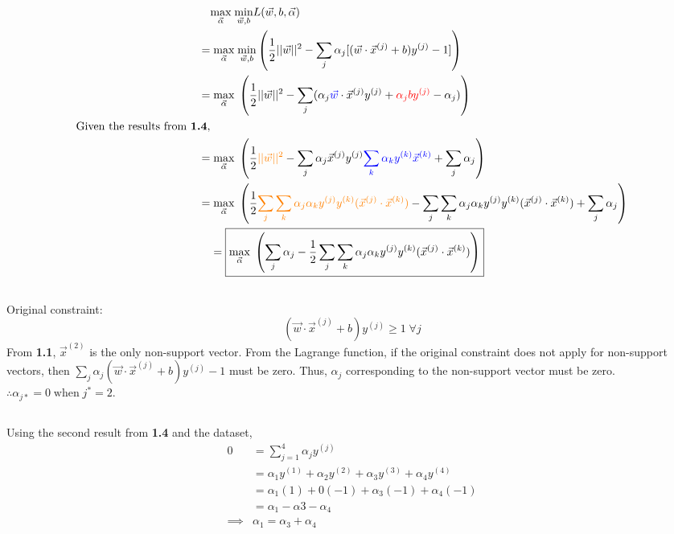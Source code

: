 \documentclass{article}
\begin{document}
\subsection{}
\begin{align*}
& \underset{\vec{\alpha}}{\text{max}}\;  \underset{\vec{w}, b}{\text{min}} L(\vec{w}, b, \vec{\alpha}) \\
=  & \;  \underset{\vec{\alpha}}{\text{max}}\;  \underset{\vec{w}, b}{\text{min}} \left(  \frac{1}{2} || \vec{w} || ^2 - \sum_j \alpha_j [ (\vec{w} \cdot \vec{x}^{(j)} + b)y^{(j)} -1] \right) \\
=  & \;  \underset{\vec{\alpha}}{\text{max}}\;  \left(  \frac{1}{2} || \vec{w} || ^2 - \sum_j (  \alpha_j \textcolor{blue}{\vec{w}} \cdot \vec{x}^{(j)} y^{(j)} + \textcolor{red}{\alpha_j b y^{(j)}} -\alpha_j ) \right) \\
\text{Given the results from \textbf{1.4},} \\
= & \;  \underset{\vec{\alpha}}{\text{max}}\;  \left( \frac{1}{2} \textcolor{orange}{|| \vec{w} || ^2} - \sum_j \alpha_j \vec{x}^{(j)} y^{(j)} \textcolor{blue}{\sum_k \alpha_k y^{(k)} \vec{x}^{(k)}} + \sum_j \alpha_j \right) \\
= & \;  \underset{\vec{\alpha}}{\text{max}}\; \left(\frac{1}{2} \textcolor{orange}{\sum_j \sum_k \alpha_j \alpha_k y^{(j)} y^{(k)} (\vec{x}^{(j)} \cdot \vec{x}^{(k)} )} - \sum_j \sum_k \alpha_j \alpha_k y^{(j)} y^{(k)} (\vec{x}^{(j)} \cdot \vec{x}^{(k)} ) + \sum_j \alpha_j \right) \\
& = \boxed{\underset{\vec{\alpha}}{\text{max}}\; \left( \sum_j \alpha_j - \frac{1}{2} \sum_j \sum_k \alpha_j \alpha_k y^{(j)} y^{(k)} (\vec{x}^{(j)} \cdot \vec{x}^{(k)} ) \right)}
\end{align*}

\subsection{}
Original constraint: $$ (\vec{w} \cdot \vec{x}^{(j)} + b) y^{(j)} \geq 1 \; \forall j$$
From \textbf{1.1}, $\vec{x}^{(2)} $ is the only non-support vector. From the Lagrange function, if the original constraint does not apply for non-support vectors, then $ \sum_j \alpha_j (\vec{w} \cdot \vec{x}^{(j)} + b) y^{(j)} - 1 $ must be zero. Thus, $\alpha_j$ corresponding to the non-support vector must be zero. $\boxed{\therefore \alpha_{j*} = 0 \; \text{when} \; j^* = 2}$.

\subsection{}
Using the second result from \textbf{1.4} and the dataset,
\begin{align*}
0 &= \sum_{j=1}^4 \alpha_j y^{(j)} \\
&= \alpha_1 y^{(1)} + \alpha_2 y^{(2)} + \alpha_3 y^{(3)} + \alpha_4 y^{(4)} \\
&= \alpha_1 (1) + 0(-1) + \alpha_3 (-1) + \alpha_4 (-1) \\
&= \alpha_1 - \alpha3 - \alpha_4 \\
\implies & \boxed{\alpha_1 = \alpha_3 + \alpha_4}
\end{align*}
\end{document}
